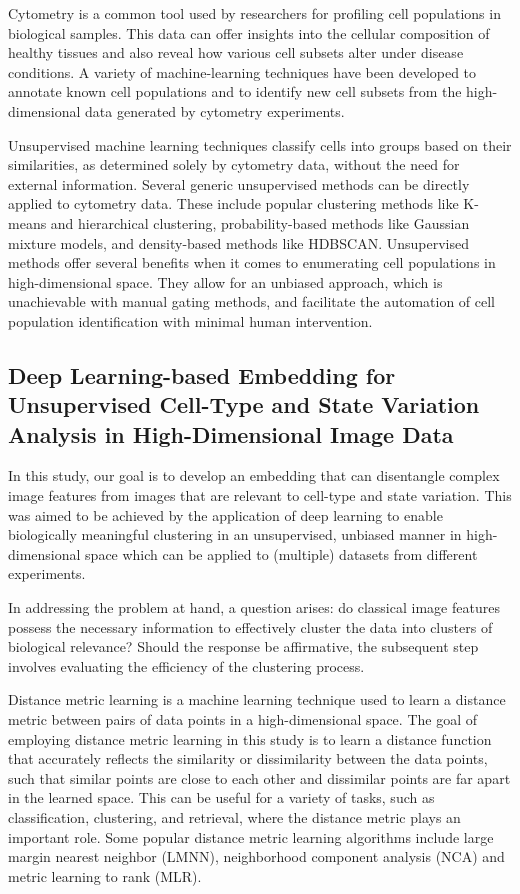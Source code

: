 \documentclass[12pt,a4paper]{article}
\begin{document}
Cytometry is a common tool used by researchers for profiling cell populations in biological samples. This data can offer insights into the cellular composition of healthy tissues and also reveal how various cell subsets alter under disease conditions. A variety of machine-learning techniques have been developed to annotate known cell populations and to identify new cell subsets from the high-dimensional data generated by cytometry experiments.

Unsupervised machine learning techniques classify cells into groups based on their similarities, as determined solely by cytometry data, without the need for external information. Several generic unsupervised methods can be directly applied to cytometry data. These include popular clustering methods like K-means and hierarchical clustering, probability-based methods like Gaussian mixture models, and density-based methods like HDBSCAN. Unsupervised methods offer several benefits when it comes to enumerating cell populations in high-dimensional space. They allow for an unbiased approach, which is unachievable with manual gating methods, and facilitate the automation of cell population identification with minimal human intervention.


\subsection{Deep Learning-based Embedding for Unsupervised Cell-Type and State Variation Analysis in High-Dimensional Image Data}
In this study, our goal is to develop an embedding that can disentangle complex image features from images that are relevant to cell-type and state variation. This was aimed to be achieved by the application of deep learning to enable biologically meaningful clustering in an unsupervised, unbiased manner in high-dimensional space which can be applied to (multiple) datasets from different experiments.

In addressing the problem at hand, a question arises: do classical image features possess the necessary information to effectively cluster the data into clusters of biological relevance? Should the response be affirmative, the subsequent step involves evaluating the efficiency of the clustering process.

Distance metric learning is a machine learning technique used to learn a distance metric between pairs of data points in a high-dimensional space. The goal of employing distance metric learning in this study is to learn a distance function that accurately reflects the similarity or dissimilarity between the data points, such that similar points are close to each other and dissimilar points are far apart in the learned space. This can be useful for a variety of tasks, such as classification, clustering, and retrieval, where the distance metric plays an important role. Some popular distance metric learning algorithms include large margin nearest neighbor (LMNN), neighborhood component analysis (NCA) and metric learning to rank (MLR). 
\end{document}
